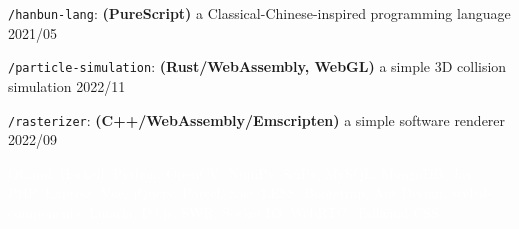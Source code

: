 \documentclass[10pt]{article}
\begin{document}
\vspace{0.5em}
\texttt{/hanbun-lang}: \textbf{(PureScript)}  a Classical-Chinese-inspired programming language \hfill 2021/05

\vspace{0.5em}
\texttt{/particle-simulation}: \textbf{(Rust/WebAssembly, WebGL)} a simple 3D collision simulation \hfill 2022/11

\vspace{0.5em}
\texttt{/rasterizer}: \textbf{(C++/WebAssembly/Emscripten)}  a simple software renderer \hfill 2022/09

\vspace{2em}
\textcolor{white}{OCaml, Haskell, Python, OpenCV, NumPy, SciPy,  MySQL, MongoDB, Java, PHP, Express, Vue, jQuery, Parcel, Sass/LESS, Bootstrap, Ant Design, styled-components, Linaria, D3.js, SWR, Socket.IO, WebRTC, Tailwind CSS}
\end{document}
